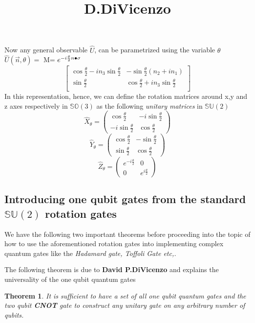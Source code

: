 \documentclass[12pt]{article}
\newtheorem{theorem}{Theorem}
\begin{document}
Now any general observable $\hat{U}$, can be parametrized using the variable $\theta$
$\hat{U}(\vec{n},\theta) =$ 
M= $e^{-i\frac{\theta}{2}{n}\bullet{\sigma}}$
\[
  \begin{bmatrix}
    \cos\frac{\theta}{2}-in_3\sin\frac{\theta}{2} & -\sin\frac{\theta}{2}(n_2+in_1) \\
    \sin\frac{\theta}{2} & \cos\frac{\theta}{2}+in_3\sin\frac{\theta}{2}\\
  \end{bmatrix}
\]
In this representation, hence, we can define the rotation matrices around x,y and z axes respectively in $\mathbb{SO}(3)$ as the following \textit{unitary matrices} in $\mathbb{SU}(2)$
$$
\hat{X}_{\theta} = 
\begin{pmatrix} 
  \cos\frac{\theta}{2}     & -i\sin\frac{\theta}{2}\\ 
  -i\sin\frac{\theta}{2} & \cos\frac{\theta}{2} 
\end{pmatrix}
$$
$$
\hat{Y}_{\theta} = 
\begin{pmatrix} 
  \cos\frac{\theta}{2}     & -\sin\frac{\theta}{2}\\ 
  \sin\frac{\theta}{2} & \cos\frac{\theta}{2} 
\end{pmatrix}
$$
$$
\hat{Z}_{\theta} = 
\begin{pmatrix} 
  e^{-i\frac{\theta}{2}}     & 0\\ 
  0 & e^{i\frac{\theta}{2} }
\end{pmatrix}
$$
\clearpage
\subsection{Introducing one qubit gates from the standard $\mathbb{SU}(2)$ rotation gates}

We have the following two important theorems before proceeding into the topic of how to use the aforementioned rotation gates into implementing complex quantum gates like the \textit{Hadamard gate, Toffoli Gate etc,.}

The following theorem is due to \textbf{David P.DiVicenzo} and explains the universality of the one qubit quantum gates
\begin{theorem}
\title{D.DiVicenzo\\}
It is sufficient to have a set of all one qubit quantum gates and the two qubit \textbf{CNOT} gate to construct any unitary gate on any arbitrary number of qubits.
\end{theorem}
\end{document}

